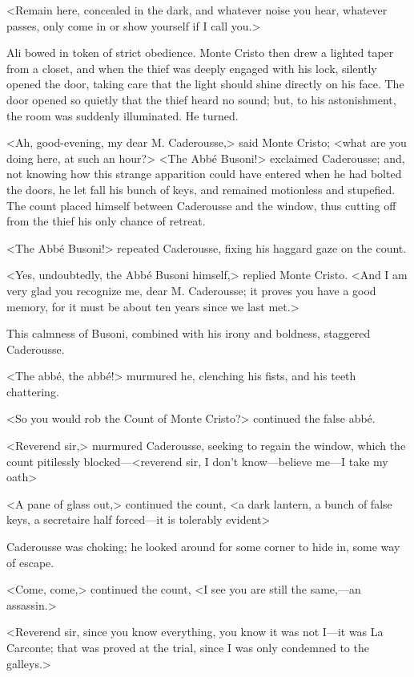  <Remain here, concealed in the dark, and whatever noise you hear, whatever passes, only come in or show yourself if I call you.> 

 Ali bowed in token of strict obedience. Monte Cristo then drew a lighted taper from a closet, and when the thief was deeply engaged with his lock, silently opened the door, taking care that the light should shine directly on his face. The door opened so quietly that the thief heard no sound; but, to his astonishment, the room was suddenly illuminated. He turned. 

 <Ah, good-evening, my dear M. Caderousse,> said Monte Cristo; <what are you doing here, at such an hour?>  <The Abbé Busoni!> exclaimed Caderousse; and, not knowing how this strange apparition could have entered when he had bolted the doors, he let fall his bunch of keys, and remained motionless and stupefied. The count placed himself between Caderousse and the window, thus cutting off from the thief his only chance of retreat. 

 <The Abbé Busoni!> repeated Caderousse, fixing his haggard gaze on the count. 

 <Yes, undoubtedly, the Abbé Busoni himself,> replied Monte Cristo. <And I am very glad you recognize me, dear M. Caderousse; it proves you have a good memory, for it must be about ten years since we last met.> 

 This calmness of Busoni, combined with his irony and boldness, staggered Caderousse. 

 <The abbé, the abbé!> murmured he, clenching his fists, and his teeth chattering. 

 <So you would rob the Count of Monte Cristo?> continued the false abbé. 

 <Reverend sir,> murmured Caderousse, seeking to regain the window, which the count pitilessly blocked—<reverend sir, I don't know—believe me—I take my oath\longdash> 

 <A pane of glass out,> continued the count, <a dark lantern, a bunch of false keys, a secretaire half forced—it is tolerably evident\longdash> 

 Caderousse was choking; he looked around for some corner to hide in, some way of escape. 

 <Come, come,> continued the count, <I see you are still the same,—an assassin.> 

 <Reverend sir, since you know everything, you know it was not I—it was La Carconte; that was proved at the trial, since I was only condemned to the galleys.> 

